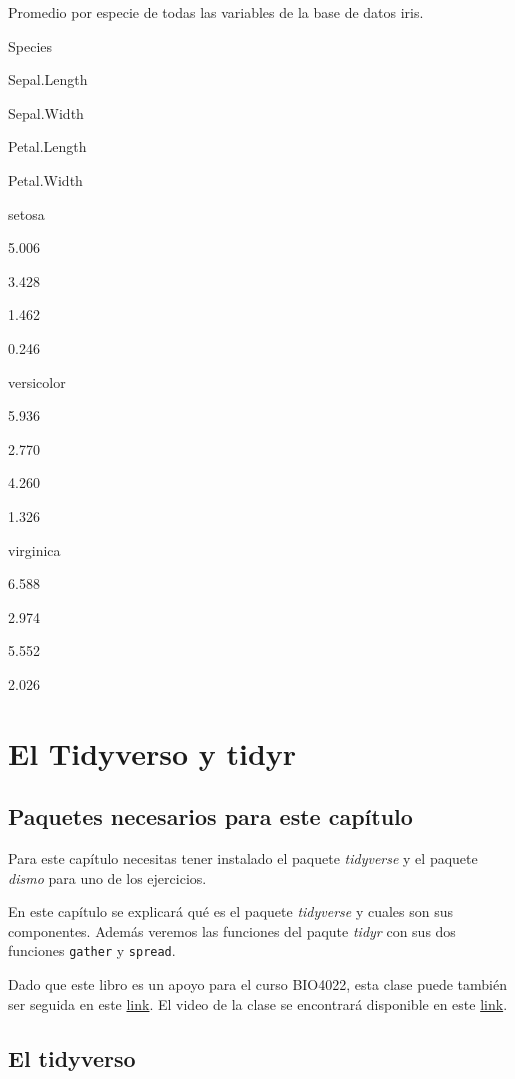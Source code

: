 \documentclass[]{book}
\begin{document}
\label{tab:SummaryMeans}Promedio por especie de todas las variables de la
base de datos iris.

Species

Sepal.Length

Sepal.Width

Petal.Length

Petal.Width

setosa

5.006

3.428

1.462

0.246

versicolor

5.936

2.770

4.260

1.326

virginica

6.588

2.974

5.552

2.026

\hypertarget{tidyverso}{%
\chapter{El Tidyverso y tidyr}\label{tidyverso}}

\hypertarget{paquetes-necesarios-para-este-capitulo-2}{%
\section{Paquetes necesarios para este
capítulo}\label{paquetes-necesarios-para-este-capitulo-2}}

Para este capítulo necesitas tener instalado el paquete \emph{tidyverse}
y el paquete \emph{dismo} para uno de los ejercicios.

En este capítulo se explicará qué es el paquete \emph{tidyverse}
\citep{Wickhamtidyverse} y cuales son sus componentes. Además veremos
las funciones del paqute \emph{tidyr} \citep{Wickhamtidy} con sus dos
funciones \texttt{gather} y \texttt{spread}.

Dado que este libro es un apoyo para el curso BIO4022, esta clase puede
también ser seguida en este
\href{https://derek-corcoran-barrios.github.io/Clase3/Clase3Hadleyverso}{link}.
El video de la clase se encontrará disponible en este
\href{https://www.youtube.com/watch?v=UhmHsx5X9Ug\&feature=youtu.be}{link}.

\hypertarget{el-tidyverso}{%
\section{El tidyverso}\label{el-tidyverso}}
\end{document}

